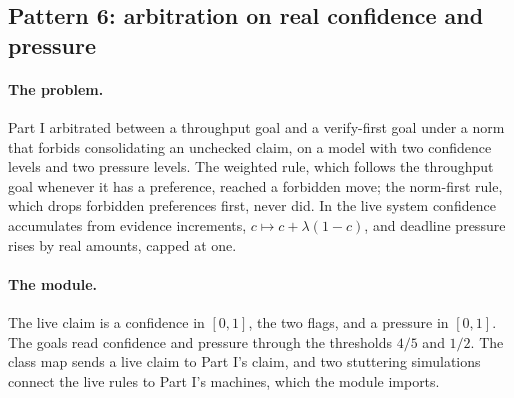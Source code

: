 \documentclass[11pt]{article}
\theoremstyle{definition}
\theoremstyle{plain}
\begin{document}
\subsection{Pattern 6: arbitration on real confidence and pressure}\label{sec:lp6}

\paragraph{The problem.} Part I arbitrated between a throughput goal and a verify-first goal under a
norm that forbids consolidating an unchecked claim, on a model with two confidence levels and two
pressure levels. The weighted rule, which follows the throughput goal whenever it has a preference,
reached a forbidden move; the norm-first rule, which drops forbidden preferences first, never did.
In the live system confidence accumulates from evidence increments, $c\mapsto c+\lambda(1-c)$, and
deadline pressure rises by real amounts, capped at one.

\paragraph{The module.} The live claim is a confidence in $[0,1]$, the two flags, and a pressure in
$[0,1]$. The goals read confidence and pressure through the thresholds $4/5$ and $1/2$. The class
map sends a live claim to Part I's claim, and two stuttering simulations connect the live rules to
Part I's machines, which the module imports.
\end{document}
